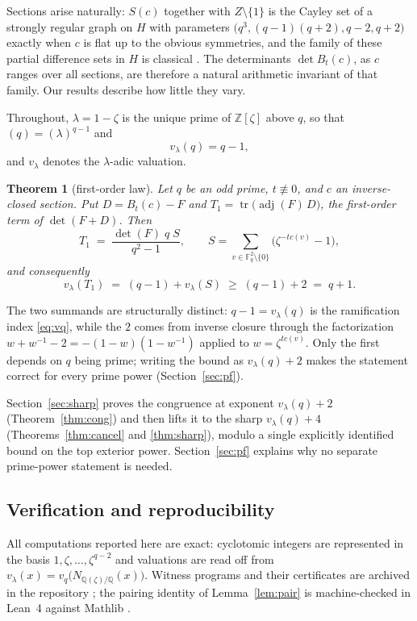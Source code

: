 \documentclass[11pt]{article}
\theoremstyle{plain}
\newtheorem{theorem}{Theorem}
\theoremstyle{definition}
\newcommand{\FF}{\mathbb F}
\newcommand{\ZZ}{\mathbb Z}
\newcommand{\QQ}{\mathbb Q}
\newcommand{\adj}{\operatorname{adj}}
\newcommand{\tr}{\operatorname{tr}}
\newcommand{\vlam}{v_\lambda}
\begin{document}
Sections arise naturally: $S(c)$ together with $Z\setminus\{1\}$ is the Cayley
set of a strongly regular graph on $H$ with parameters
$\bigl(q^3,(q-1)(q+2),q-2,q+2\bigr)$ exactly when $c$ is flat up to the obvious
symmetries, and the family of these partial difference sets in $H$ is
classical \cite{Ma,PDSS}. The determinants $\det B_t(c)$, as $c$ ranges over
all sections, are therefore a natural arithmetic invariant of that family. Our
results describe how little they vary.

Throughout, $\lambda=1-\zeta$ is the unique prime of $\ZZ[\zeta]$ above $q$, so
that $(q)=(\lambda)^{q-1}$ and
\begin{equation}\label{eq:vq}
\vlam(q)=q-1,
\end{equation}
and $\vlam$ denotes the $\lambda$-adic valuation.

\begin{theorem}[first-order law]\label{thm:main}
Let $q$ be an odd prime, $t\not\equiv0$, and $c$ an inverse-closed section. Put
$D=B_t(c)-F$ and $T_1=\tr\bigl(\adj(F)\,D\bigr)$, the first-order term of
$\det(F+D)$. Then
\[
T_1\;=\;\frac{\det(F)\;q\;S}{q^2-1},
\qquad
S=\sum_{v\in\FF_q^2\setminus\{0\}}\bigl(\zeta^{-t c(v)}-1\bigr),
\]
and consequently
\[
\vlam(T_1)\;=\;(q-1)+\vlam(S)\;\ge\;(q-1)+2\;=\;q+1 .
\]
\end{theorem}

The two summands are structurally distinct: $q-1=\vlam(q)$ is the ramification
index \eqref{eq:vq}, while the $2$ comes from inverse closure through the
factorization $w+w^{-1}-2=-(1-w)(1-w^{-1})$ applied to $w=\zeta^{tc(v)}$. Only
the first depends on $q$ being prime; writing the bound as $\vlam(q)+2$ makes
the statement correct for every prime power (Section~\ref{sec:pf}).

Section~\ref{sec:sharp} proves the congruence at exponent $\vlam(q)+2$
(Theorem~\ref{thm:cong}) and then lifts it to the sharp $\vlam(q)+4$
(Theorems~\ref{thm:cancel} and \ref{thm:sharp}), modulo a single explicitly
identified bound on the top exterior power. Section~\ref{sec:pf} explains why
no separate prime-power statement is needed.

\subsection*{Verification and reproducibility}
All computations reported here are exact: cyclotomic integers are represented
in the basis $1,\zeta,\dots,\zeta^{q-2}$ and valuations are read off from
$\vlam(x)=v_q\bigl(N_{\QQ(\zeta)/\QQ}(x)\bigr)$. Witness programs and their
certificates are archived in the repository \cite{repo}; the pairing identity
of Lemma~\ref{lem:pair} is machine-checked in Lean~4 against
Mathlib \cite{mathlib}.
\end{document}
